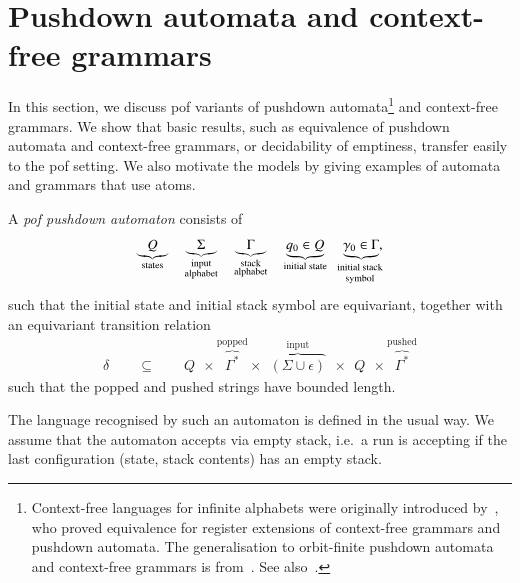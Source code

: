\section{Pushdown automata and context-free grammars}
\label{sec:cfl}
In this section, we discuss pof variants of  pushdown automata\footnote{Context-free languages for infinite alphabets were originally introduced by~\cite{DBLP:journals/acta/ChengK98}, who proved equivalence for register extensions of context-free grammars and pushdown automata. The generalisation to orbit-finite pushdown automata and context-free grammars is from~\cite{DBLP:journals/corr/BojanczykKL14}. See also~\cite{DBLP:conf/mfcs/MurawskiRT14,DBLP:conf/csl/ClementeL15,DBLP:conf/lics/ClementeL15}. } and context-free grammars.  We show that basic results, such as equivalence of pushdown automata and context-free grammars, or decidability of emptiness,  transfer easily to the pof setting. We also motivate the models by giving examples of automata and grammars that use atoms. 

 
 \begin{definition}\label{def:orbit-finite-pushdown}  
	A \emph{pof pushdown automaton}  consists of 
	\begin{align*}
  \underbrace{Q}_{\text{states}} \quad   \underbrace{\Sigma}_{\substack{\text{input}\\ \text{alphabet}}} \quad  \underbrace{\Gamma}_{\substack{\text{stack}\\ \text{alphabet}}} \quad    \underbrace{q_0 \in Q}_{\text{initial state}} \quad   \myunderbrace{\gamma_0 \in \Gamma}{initial stack\\ symbol},
\end{align*}
such that the initial state and initial stack symbol are equivariant, together with an equivariant transition relation
\begin{align*}
	\delta \qquad \subseteq \qquad  Q\ \  \times \overbrace{\Gamma^*}^{\text{popped}} \times \ \  \overbrace{(\Sigma \cup \epsilon)}^{\text{input}} \ \  \times \ \  Q\ \  \times \overbrace{\Gamma^*}^{\text{pushed}}
\end{align*}
such that the popped and pushed strings have bounded length.
\end{definition}

The language recognised by such an automaton is defined in the usual way.  We assume that the automaton accepts via empty stack, i.e.~a run is accepting if the last configuration (state, stack contents) has an empty stack.  


